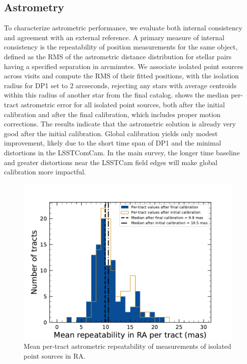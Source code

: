 \subsection{Astrometry}
To characterize astrometric performance, we evaluate both internal consistency and agreement with an external reference.
A primary measure of internal consistency is the repeatability of position measurements for the same object, defined as the RMS of the astrometric distance distribution for stellar pairs having a specified separation in arcminutes. 
We associate isolated point sources across visits and compute the RMS of their fitted positions, with the isolation radius for DP1 set to 2 arcseconds, rejecting any stars with average centroids within this radius of another star from the final catalog.
 shows the median per-\gls{tract} astrometric error for all isolated point sources, both after the initial calibration and after the final calibration, which includes proper motion corrections.
The results indicate that the astrometric solution is already very good after the initial \gls{calibration}.
Global calibration yields only modest improvement, likely due to the short time span of \gls{DP1} and the minimal distortions in the LSSTComCam.
In the main survey, the longer time baseline and greater distortions near the \gls{LSSTCam} field edges will make global calibration more impactful.
 \begin{figure}[htb!]
 \centering
 \includegraphics[width=0.98\linewidth]{Astrometry_dmAstroErr.pdf}
 \caption{Mean per-tract astrometric repeatability of measurements of isolated point sources in RA.}
 \label{fig:dmAstroErr}
 \end{figure}

